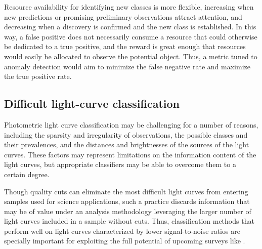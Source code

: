 Resource availability for identifying new classes is more flexible, increasing when new predictions or promising preliminary observations attract attention, and decreasing when a discovery is confirmed and the new class is established.
In this way, a false positive does not necessarily consume a resource that could otherwise be dedicated to a true positive, and the reward is great enough that resources would easily be allocated to observe the potential object.
Thus, a metric tuned to anomaly detection would aim to minimize the false negative rate and maximize the true positive rate.

%

\subsection{Difficult light-curve classification}
\label{sec:difficult}

Photometric light curve classification may be challenging for a number of reasons, including the sparsity and irregularity of observations, the possible classes and their prevalences, and the distances and brightnesses of the sources of the light curves.
These factors may represent limitations on the information content of the light curves, but appropriate classifiers may be able to overcome them to a certain degree.

Though quality cuts can eliminate the most difficult light curves from entering samples used for science applications, such a practice discards information that may be of value under an analysis methodology leveraging the larger number of light curves included in a sample without cuts.
Thus, classification methods that perform well on light curves characterized by lower signal-to-noise ratios are specially important for exploiting the full potential of upcoming surveys like \lsst.

